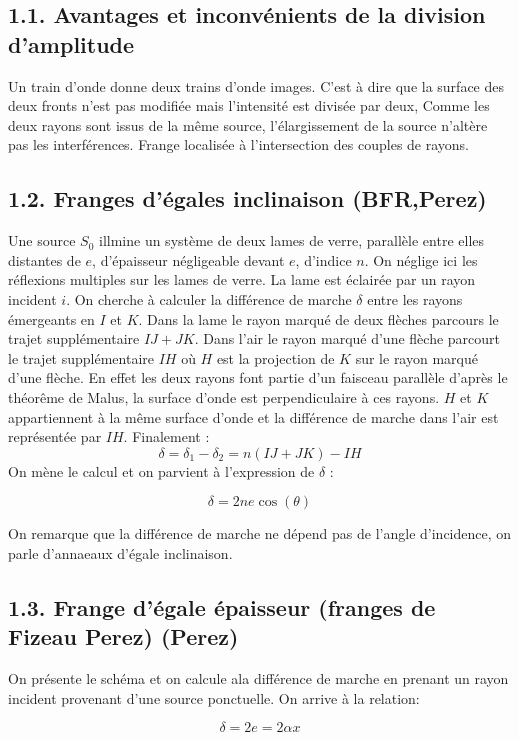 \documentclass[french, a4paper, 10pt, twocolumn, landscape]{article}
\begin{document}
\subsection*{1.1. Avantages et  inconvénients de la division d'amplitude}
Un train d'onde donne deux trains d'onde images. C'est à dire que la surface des deux fronts n'est pas modifiée mais l'intensité est divisée par deux, Comme les deux rayons sont issus de la même source, l'élargissement de la source n'altère pas les interférences. Frange localisée à l'intersection des couples de rayons.

\subsection*{1.2. Franges d'égales inclinaison (BFR,Perez)}
Une source $S_0$ illmine un système de deux lames de verre, parallèle entre elles distantes de $e$, d'épaisseur négligeable devant $e$, d'indice $n$. On néglige ici les réflexions multiples sur les lames de verre. 
La lame est éclairée par un rayon incident $i$. On cherche à calculer la différence de marche $\delta$ entre les rayons émergeants en $I$ et $K$. Dans la lame le rayon marqué de deux flèches parcours le trajet supplémentaire $IJ+JK$. Dans l'air le rayon marqué d'une flèche parcourt le trajet supplémentaire $IH$ où $H$ est la projection de $K$ sur le rayon marqué d'une flèche. En effet les deux rayons font partie d'un faisceau parallèle d'après le théorême de Malus, la surface d'onde est perpendiculaire à ces rayons. $H$ et $K$ appartiennent à la même surface d'onde et la différence de marche dans l'air est représentée par $IH$. Finalement : \[\delta = \delta_1-\delta_2=n(IJ+JK)-IH\]
 On mène le calcul et on parvient à l'expression de $\delta$ : 

 \begin{equation}
	\delta = 2ne\cos(\theta)
 \end{equation}

On remarque que la différence de marche ne dépend pas de l'angle d'incidence, on parle d'annaeaux d'égale inclinaison. 

\subsection*{1.3. Frange d'égale épaisseur (franges de Fizeau Perez) (Perez)}
On présente le schéma et on calcule ala différence de marche en prenant un rayon incident provenant d'une source ponctuelle. On arrive à la relation:

\begin{equation}
	\delta = 2e = 2\alpha x
\end{equation}
\end{document}
